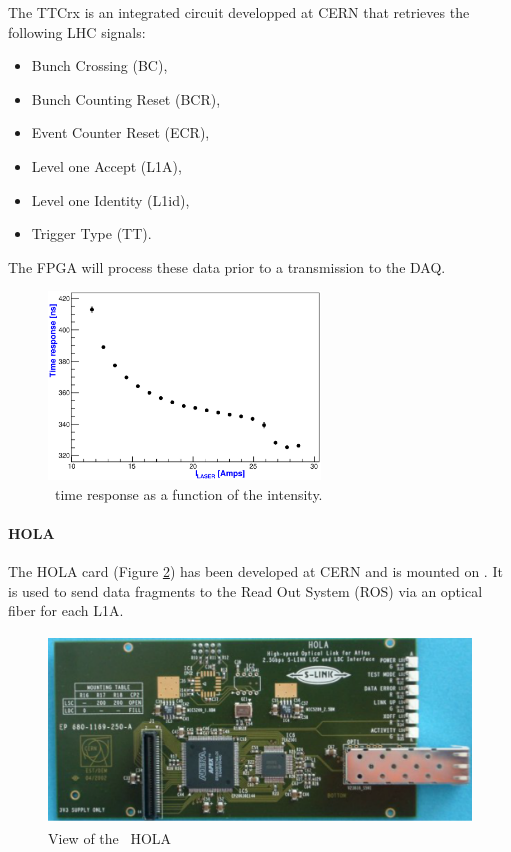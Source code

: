 The TTCrx \cite{ref:ttcrx} is an integrated circuit developped at CERN that retrieves the following LHC signals:
\begin{itemize}
\item Bunch Crossing (BC),
\item Bunch Counting Reset (BCR),
\item Event Counter Reset (ECR),
\item Level one Accept (L1A),
\item Level one Identity (L1id),
\item Trigger Type (TT).
\end{itemize}

The FPGA will process these data prior to  a transmission to the DAQ.

\begin{figure}[htbp]
\centering
\includegraphics[height=5cm]{figures/laser_timing_new.eps}
\caption{\las~time response as a function of the intensity.}\label{fig:lasresponse}
\end{figure}


\paragraph{HOLA}

The HOLA card \cite{ref:hola} (Figure \ref{fig:laslascarhola}) has been developed at CERN and is mounted on \lascar. It is used to send data fragments to the Read Out System (ROS) via an optical fiber for each L1A.
\begin{figure}[htbp]

\centering
\includegraphics[height=5cm]{figures/hola.pdf}
\caption{View of the \lascar~HOLA}\label{fig:laslascarhola}
\end{figure}

